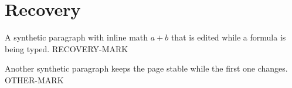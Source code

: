 \documentclass{article}
\begin{document}
\section{Recovery}
A synthetic paragraph with inline math $a+b$ that is edited while a formula is being typed. RECOVERY-MARK

Another synthetic paragraph keeps the page stable while the first one changes. OTHER-MARK
\end{document}
